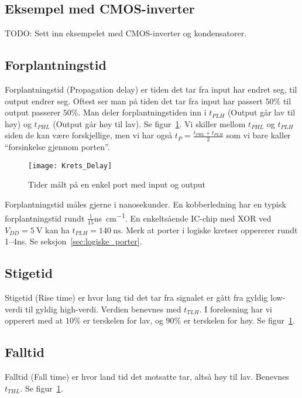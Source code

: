 \documentclass[12pt,a4paper,norsk]{article}
\begin{document}
\subsection{Eksempel med CMOS-inverter}
TODO\@: Sett inn eksempelet med CMOS-inverter og kondensatorer.

\subsection{Forplantningstid}
Forplantningstid (Propagation delay) er tiden det tar fra input har
endret seg, til output endrer seg. Oftest ser man på tiden det tar fra input har
passert $50\%$ til output passerer $50\%$. Man deler
forplantningstiden inn i $t_{PLH}$ (Output går lav til høy) og $t_{PHL}$ (Output
går høy til lav). Se figur~\ref{fig:delay}. Vi skiller mellom $t_{PHL}$ og
$t_{PLH}$ siden de kan være forskjellige, men vi har også
$t_{P} = \frac{t_{PHL}+t_{PLH}}{2}$ som vi bare kaller ``forsinkelse gjennom porten''.

\begin{figure}[hbt!]
  \centering
  \texttt{[image: Krets\_Delay]}
  \caption{Tider målt på en enkel port med input og output\label{fig:delay}}
\end{figure}

Forplantningstid måles gjerne i nanosekunder. En kobberledning har en typisk
forplantningstid rundt $\frac{1}{15}$\si[per-mode =
fraction]{\nano\second\per\centi\meter}. En enkeltsående IC-chip med XOR ved
$V_{DD}=\SI{5}{\volt}$ kan ha $t_{PLH} = \SI{140}{\nano\second}$. Merk
at porter i logiske kretser oppererer rundt 1--4\si{\nano\second}. Se
seksjon~\ref{sec:logiske_porter}.

\subsection{Stigetid}
Stigetid (Rise time) er hvor lang tid det tar fra signalet
er gått fra gyldig low-verdi til gyldig high-verdi. Verdien benevnes med
$t_{TLH}$. I forelesning har vi opperert med at $10\%$ er terskelen for lav, og
$90\%$ er terskelen for høy. Se figur~\ref{fig:delay}.

\subsection{Falltid}
Falltid (Fall time) er hvor land tid det motsatte tar, altså høy til lav.
Benevnes $t_{THL}$. Se figur~\ref{fig:delay}.
\end{document}
